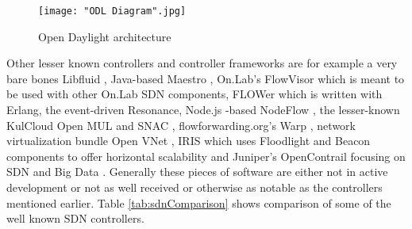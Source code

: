 \begin{figure}[h!t]
\centering
{}
\texttt{[image: "ODL Diagram".jpg]}
\caption{Open Daylight architecture}
\label{fig:ODL}
\end{figure}

Other lesser known controllers and controller frameworks are for example a very bare bones Libfluid \cite{Libfluid}, Java-based Maestro \cite{Maestro}, On.Lab’s FlowVisor \cite{FlowVisor} which is meant to be used with other On.Lab SDN components, FLOWer \cite{Flower} which is written with Erlang, the event-driven Resonance\cite{Resonance}, Node.js -based NodeFlow \cite{Nodeflow}, the lesser-known KulCloud Open MUL and SNAC \cite{MUL, SNAC}, flowforwarding.org’s Warp \cite{Warp}, network virtualization bundle Open VNet \cite{VNet}, IRIS which uses Floodlight and Beacon components to offer horizontal scalability \cite{IRIS} and Juniper’s OpenContrail focusing on SDN and Big Data \cite{Contrail}. Generally these pieces of software are either not in active development or not as well received or otherwise as notable as the controllers mentioned earlier. Table \ref{tab:sdnComparison} shows comparison of some of the well known SDN controllers.  

